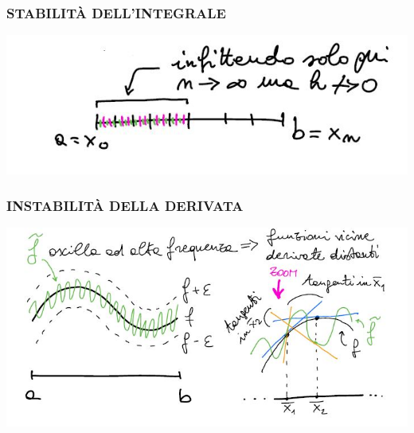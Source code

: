 \subsubsection{STABILITÀ DELL'INTEGRALE}
\begin{center}
    \includegraphics[scale=0.6]{foto/calcolo}
\end{center}
\subsubsection{INSTABILITÀ DELLA DERIVATA}
\begin{center}
    \includegraphics[scale=0.6]{foto/calcolo55}
\end{center}

